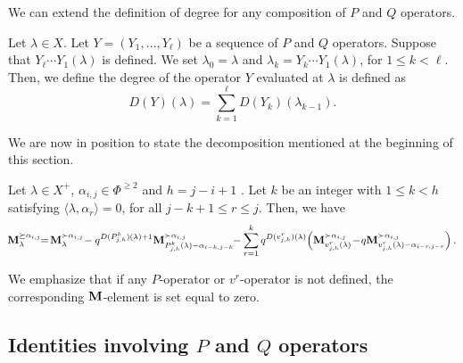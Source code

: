 We can extend the definition of degree for any composition of $P$ and $Q$ operators. 

\begin{definition} \rm
    Let $\lambda \in X$. 
    Let $Y=(Y_1,\ldots ,Y_{\ell})$ be a sequence of $P$ and $Q$ operators. 
    Suppose that $Y_{\ell} \cdots Y_1(\lambda)$ is defined.
    We set $\lambda_0=\lambda$ and $\lambda_k =Y_k\cdots Y_{1}(\lambda)$, for $1\leq k < \ell$.
    Then, we define the degree of the operator $Y$ evaluated at $\lambda$ is defined as
    \begin{equation}
        D(Y)(\lambda) = \sum_{k=1}^{\ell} D(Y_k)(\lambda_{k-1}). 
    \end{equation}
\end{definition}




We are now in position to state the decomposition mentioned at the beginning of this section.
 

\begin{proposition}\rm\label{prop: second version}
    Let $\lambda\in X^{+}$,  $\alpha_{i,j}\in \Phi^{\geq 2}$ and $h=j-i+1$ .  Let $k$ be an integer with $1\leq k <h$ satisfying  $\langle \lambda , \alpha_r \rangle  =0$, for all $j-k+1\leq r \leq j$. Then,  we have    
    \begin{equation}\label{eq: second version}
     \!  \bfM_{\lambda}^{\succeq \alpha_{i,j}}\! \!  = \! \bfM_{\lambda}^{\succ \alpha_{i,j}} \!  - q^{D(P^{k}_{j,h})(\lambda)+1} \bfM_{P^k_{j,h}(\lambda) - \alpha_{i-k,j-k}}^{\succ \alpha_{i,j}}\! \!  -  \displaystyle\sum_{r=1}^{k} q^{D(v^{r}_{j,h})(\lambda)} \! \left( \bfM_{v^{r}_{j,h}(\lambda)}^{\succ \alpha_{i,j}}\!  -\!  q\bfM_{v^{r}_{j,h}(\lambda)-\alpha_{i-r,j-r}}^{\succ \alpha_{i,j}}\right).
    \end{equation}
\end{proposition}

\begin{remark}\rm\label{remark operator not defined}
       We emphasize that if any $P$-operator or $v^r$-operator is not defined, the corresponding $\mathbf{M}$-element is set  equal to zero. 
\end{remark}
    




\subsection{Identities involving $P$ and $Q$ operators}


